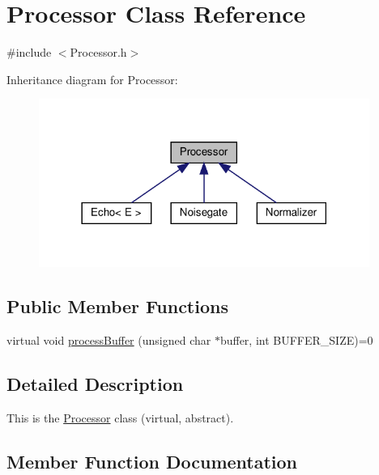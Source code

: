 \hypertarget{classProcessor}{}\section{Processor Class Reference}
\label{classProcessor}


{\ttfamily \#include $<$Processor.\+h$>$}



Inheritance diagram for Processor\+:
\nopagebreak
\begin{figure}[H]
\begin{center}
\leavevmode
\includegraphics[width=306pt]{dd/d93/classProcessor__inherit__graph}
\end{center}
\end{figure}
\subsection*{Public Member Functions}
\begin{DoxyCompactItemize}
\item 
virtual void \hyperlink{classProcessor_a13e6240144c7a530079b0e2ae4a4526d}{process\+Buffer} (unsigned char $\ast$buffer, int B\+U\+F\+F\+E\+R\+\_\+\+S\+I\+ZE)=0
\end{DoxyCompactItemize}


\subsection{Detailed Description}
This is the \hyperlink{classProcessor}{Processor} class (virtual, abstract). 

\subsection{Member Function Documentation}
\mbox{\label{classProcessor_a13e6240144c7a530079b0e2ae4a4526d}} 
